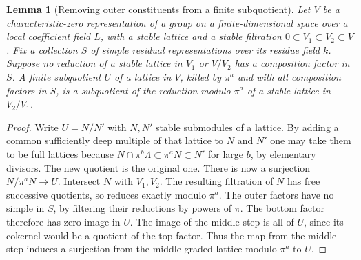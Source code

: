 \documentclass[a4paper,11pt]{article}
\newtheorem{lemma}[proposition]{Lemma}
\theoremstyle{definition}
\theoremstyle{remark}
\numberwithin{equation}{section}
\begin{document}
\begin{lemma}[Removing outer constituents from a finite subquotient]
\leavevmode\label{lem:discardouter747}
Let \(V\) be a characteristic-zero representation of a group on
a finite-dimensional space over a local coefficient field \(L\),
with a stable lattice and a stable filtration
\(0\subset V_1\subset V_2\subset V\). Fix a collection \(S\)
of simple residual representations over its residue field \(k\).
Suppose no reduction of a stable lattice in \(V_1\) or \(V/V_2\)
has a composition factor in \(S\).
A finite subquotient \(U\) of a lattice in \(V\), killed by
\(\pi^a\) and with all composition factors in \(S\), is a
subquotient of the reduction modulo \(\pi^a\) of a stable
lattice in \(V_2/V_1\).
\end{lemma}
\begin{proof}
Write \(U=N/N'\) with \(N,N'\) stable submodules of a lattice.
By adding a common sufficiently deep multiple of that lattice
to \(N\) and \(N'\) one may take them to be full lattices because \(N\cap\pi^b\Lambda\subset\pi^aN\subset N'\) for large
\(b\), by elementary divisors. The new quotient is the original
one. There is now a surjection \(N/\pi^aN\to U\).
Intersect \(N\) with \(V_1,V_2\). The resulting filtration of
\(N\) has free successive quotients, so reduces exactly modulo
\(\pi^a\). The outer factors have no simple in \(S\), by filtering
their reductions by powers of \(\pi\). The bottom factor therefore
has zero image in \(U\). The image of the middle step is all of
\(U\), since its cokernel would be a quotient of the top factor.
Thus the map from the middle step induces a surjection from the
middle graded lattice modulo \(\pi^a\) to \(U\).
\end{proof}
\end{document}

